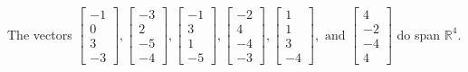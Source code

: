 \begin{exercise}
\begin{exerciseStatement}
  \end{exerciseStatement}
  \begin{exerciseAnswer}
   The vectors \(\left[\begin{array}{r}
-1 \\
0 \\
3 \\
-3
\end{array}\right] , \left[\begin{array}{r}
-3 \\
2 \\
-5 \\
-4
\end{array}\right] , \left[\begin{array}{r}
-1 \\
3 \\
1 \\
-5
\end{array}\right] , \left[\begin{array}{r}
-2 \\
4 \\
-4 \\
-3
\end{array}\right] , \left[\begin{array}{r}
1 \\
1 \\
3 \\
-4
\end{array}\right] , \text{ and } \left[\begin{array}{r}
4 \\
-2 \\
-4 \\
4
\end{array}\right]\) 
  	 do  
	span \(\mathbb{R}^4\).
  


  \end{exerciseAnswer}
\end{exercise}